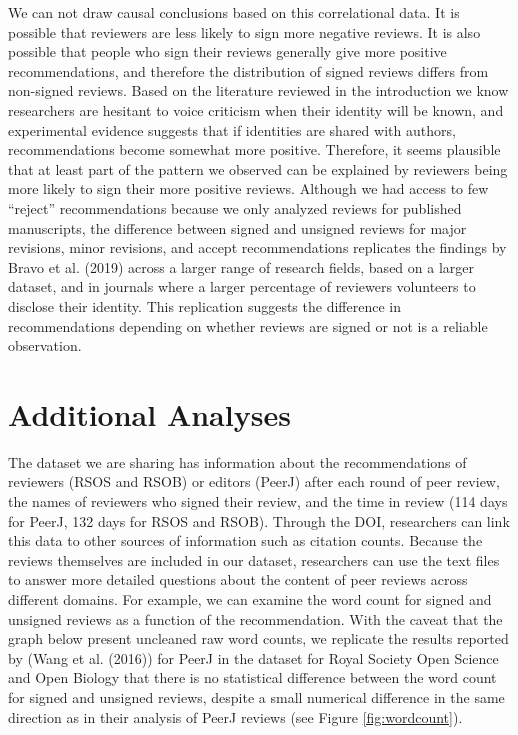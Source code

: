 \documentclass[,jou, a4paper,floatsintext]{apa6}
\begin{document}
We can not draw causal conclusions based on this correlational data. It is possible that reviewers are less likely to sign more negative reviews. It is also possible that people who sign their reviews generally give more positive recommendations, and therefore the distribution of signed reviews differs from non-signed reviews. Based on the literature reviewed in the introduction we know researchers are hesitant to voice criticism when their identity will be known, and experimental evidence suggests that if identities are shared with authors, recommendations become somewhat more positive. Therefore, it seems plausible that at least part of the pattern we observed can be explained by reviewers being more likely to sign their more positive reviews. Although we had access to few \enquote{reject} recommendations because we only analyzed reviews for published manuscripts, the difference between signed and unsigned reviews for major revisions, minor revisions, and accept recommendations replicates the findings by Bravo et al. (2019) across a larger range of research fields, based on a larger dataset, and in journals where a larger percentage of reviewers volunteers to disclose their identity. This replication suggests the difference in recommendations depending on whether reviews are signed or not is a reliable observation.

\hypertarget{additional-analyses}{%
\section{Additional Analyses}\label{additional-analyses}}

The dataset we are sharing has information about the recommendations of reviewers (RSOS and RSOB) or editors (PeerJ) after each round of peer review, the names of reviewers who signed their review, and the time in review (114 days for PeerJ, 132 days for RSOS and RSOB). Through the DOI, researchers can link this data to other sources of information such as citation counts. Because the reviews themselves are included in our dataset, researchers can use the text files to answer more detailed questions about the content of peer reviews across different domains. For example, we can examine the word count for signed and unsigned reviews as a function of the recommendation. With the caveat that the graph below present uncleaned raw word counts, we replicate the results reported by (Wang et al. (2016)) for PeerJ in the dataset for Royal Society Open Science and Open Biology that there is no statistical difference between the word count for signed and unsigned reviews, despite a small numerical difference in the same direction as in their analysis of PeerJ reviews (see Figure \ref{fig:wordcount}).
\end{document}
